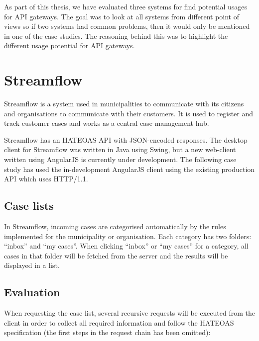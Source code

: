 \documentclass{cslthse-msc}
\begin{document}
As part of this thesis, we have evaluated three systems for find potential usages for API gateways. The goal was to look at all systems from different point of views so if two systems had common problems, then it would only be mentioned in one of the case studies. The reasoning behind this was to highlight the different usage potential for API gateways.

\section{Streamflow}
Streamflow\cite{streamflow} is a system used in municipalities to communicate with its citizens and organisations to communicate with their customers. It is used to register and track customer cases and works as a central case management hub.

Streamflow has an HATEOAS API with JSON-encoded responses. The desktop client for Streamflow was written in Java using Swing, but a new web-client written using AngularJS is currently under development. The following case study has used the in-development AngularJS client using the existing production API which uses HTTP/1.1.

\subsection{Case lists}
In Streamflow, incoming cases are categorised automatically by the rules implemented for the municipality or organisation. Each category has two folders: \enquote{inbox} and \enquote{my cases}. When clicking \enquote{inbox} or \enquote{my cases} for a category, all cases in that folder will be fetched from the server and the results will be displayed in a list.

\subsection{Evaluation}
When requesting the case list, several recursive requests will be executed from the client in order to collect all required information and follow the HATEOAS specification (the first steps in the request chain has been omitted):
\end{document}
